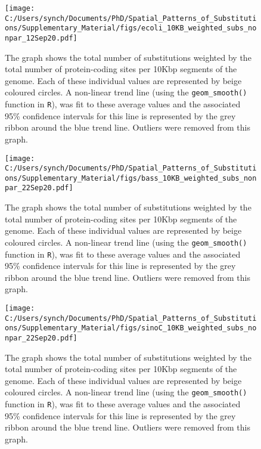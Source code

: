 \documentclass[12pt]{article}
\begin{document}
\begin{figure}[h]
	\begin{center}
		\texttt{[image: C:/Users/synch/Documents/PhD/Spatial\_Patterns\_of\_Substitutions/Supplementary\_Material/figs/ecoli\_10KB\_weighted\_subs\_nonpar\_12Sep20.pdf]}
		\caption{\label{fig:ecoli_nonpar}The graph shows the total number of substitutions weighted by the total number of protein-coding sites per 10Kbp segments of the genome. Each of these individual values are represented by beige coloured circles. A non-linear trend line (using the \texttt{geom\_smooth()} function in \texttt{R}), was fit to these average values and the associated 95\% confidence intervals for this line is represented by the grey ribbon around the blue trend line. Outliers were removed from this graph.}
	\end{center}
\end{figure}

\begin{figure}[h]
	\begin{center}
		\texttt{[image: C:/Users/synch/Documents/PhD/Spatial\_Patterns\_of\_Substitutions/Supplementary\_Material/figs/bass\_10KB\_weighted\_subs\_nonpar\_22Sep20.pdf]}
		\caption{\label{fig:bass_nonpar}The graph shows the total number of substitutions weighted by the total number of protein-coding sites per 10Kbp segments of the genome. Each of these individual values are represented by beige coloured circles. A non-linear trend line (using the \texttt{geom\_smooth()} function in \texttt{R}), was fit to these average values and the associated 95\% confidence intervals for this line is represented by the grey ribbon around the blue trend line. Outliers were removed from this graph.}
	\end{center}
\end{figure}

\begin{figure}[h]
	\begin{center}
		\texttt{[image: C:/Users/synch/Documents/PhD/Spatial\_Patterns\_of\_Substitutions/Supplementary\_Material/figs/sinoC\_10KB\_weighted\_subs\_nonpar\_22Sep20.pdf]}
		\caption{\label{fig:sinoC_nonpar}The graph shows the total number of substitutions weighted by the total number of protein-coding sites per 10Kbp segments of the genome. Each of these individual values are represented by beige coloured circles. A non-linear trend line (using the \texttt{geom\_smooth()} function in \texttt{R}), was fit to these average values and the associated 95\% confidence intervals for this line is represented by the grey ribbon around the blue trend line. Outliers were removed from this graph.}
	\end{center}
\end{figure}
\end{document}
